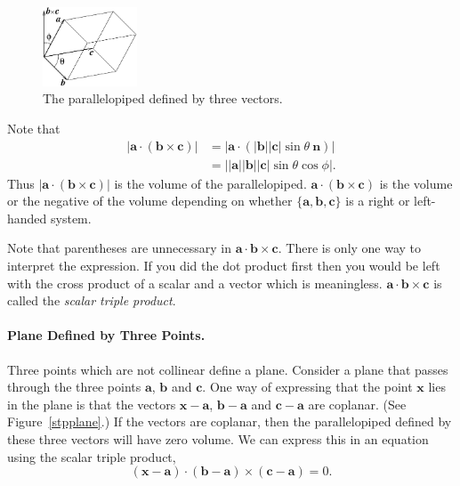 \begin{figure}[htb!]
\begin{center}
  \includegraphics[width=0.25\textwidth]{algebra/vectors/paraped}
\end{center}
\caption{The parallelopiped defined by three vectors.}
\label{paraped}
\end{figure}

Note that 
\begin{align*}
\left| \mathbf{a} \cdot (\mathbf{b} \times \mathbf{c}) \right|
        &= \left| \mathbf{a} \cdot ( |\mathbf{b}| |\mathbf{c}| \sin \theta \ \mathbf{n} ) 
                \right| \\
        &= \left| |\mathbf{a}| |\mathbf{b}| |\mathbf{c}| \sin \theta \cos \phi \right|.
\end{align*}
Thus $\left| \mathbf{a} \cdot (\mathbf{b} \times \mathbf{c}) \right|$ is the volume of 
the parallelopiped.  $\mathbf{a} \cdot ( \mathbf{b} \times \mathbf{c} )$ is the volume
or the negative of the volume depending on whether 
$\{\mathbf{a}, \mathbf{b},\mathbf{c}\}$ is a right or left-handed system.

Note that parentheses are unnecessary in 
$\mathbf{a} \cdot \mathbf{b} \times \mathbf{c}$.  There is only one way to 
interpret the expression.  If you did the dot product first then you
would be left with the cross product of a scalar and a vector 
which is meaningless.  $\mathbf{a} \cdot \mathbf{b} \times \mathbf{c}$ is called
the \textit{scalar triple product}.


\paragraph{Plane Defined by Three Points.}
Three points which are not collinear define a plane.  Consider a plane 
that passes through the three points $\mathbf{a}$, $\mathbf{b}$ and $\mathbf{c}$.
One way of expressing that the point $\mathbf{x}$ lies in the plane is that 
the vectors $\mathbf{x} - \mathbf{a}$, $\mathbf{b} - \mathbf{a}$ and $\mathbf{c} - \mathbf{a}$ 
are coplanar.  (See Figure~\ref{stpplane}.)
If the vectors are coplanar, then the parallelopiped
defined by these three vectors will have zero volume.  We can express this
in an equation using the scalar triple product,
\[
(\mathbf{x} - \mathbf{a}) \cdot (\mathbf{b} - \mathbf{a}) \times (\mathbf{c} - \mathbf{a}) = 0.
\]

